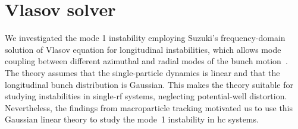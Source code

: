\documentclass[a4paper,
               ]{jacow}
\begin{document}
\section{Vlasov solver}
We investigated the mode 1 instability employing Suzuki's frequency-domain solution of Vlasov equation for longitudinal instabilities, which allows mode coupling between different azimuthal and radial modes of the bunch motion~\cite{Suzuki1983}. The theory assumes that the single-particle dynamics is linear and that the longitudinal bunch distribution is Gaussian. This makes the theory suitable for studying instabilities in single-rf systems, neglecting potential-well distortion. Nevertheless, the findings from macroparticle tracking motivated us to use this Gaussian linear theory to study the mode~1 instability in \gls{hc} systems.
\end{document}
